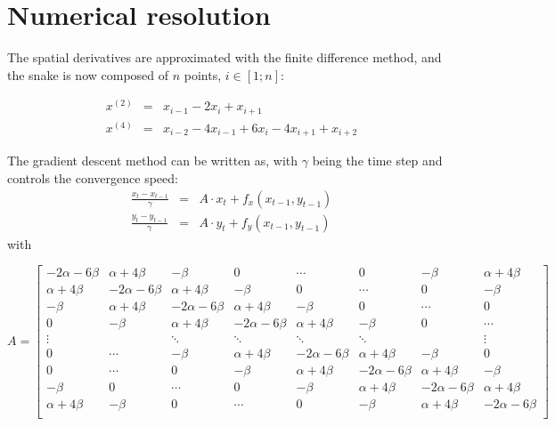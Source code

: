 \section{Numerical resolution}
The spatial derivatives are approximated with the finite difference method, and the snake is now composed of $n$ points, $i\in[1;n]$:

\begin{eqnarray*}
x^{(2)}&=&x_{i-1}-2x_i+x_{i+1} \\
x^{(4)}&=&x_{i-2}-4x_{i-1}+6x_i-4x_{i+1}+x_{i+2}
\end{eqnarray*}

The gradient descent method can be written as, with $\gamma$ being the time step and controls the convergence speed:
\begin{eqnarray*}
\frac{x_t-x_{t-1}}{\gamma} &=& A\cdot x_t + f_x(x_{t-1}, y_{t-1})\\
\frac{y_t-y_{t-1}}{\gamma} &=& A\cdot y_t + f_y(x_{t-1}, y_{t-1}) 
\end{eqnarray*}
with

$$A=\left[\begin{smallmatrix}
 -2\alpha-6\beta & \alpha+4\beta  & -\beta        &        0 &\cdots          & 0        & -\beta & \alpha+4\beta \\
 \alpha+4\beta   &-2\alpha-6\beta & \alpha+4\beta & -\beta   & 0   &\cdots          &     0   & -\beta        \\
 -\beta          & \alpha+4\beta  &-2\alpha-6\beta& \alpha+4\beta  & -\beta        & 0        &\cdots   & 0               \\
 0               &-\beta          & \alpha+4\beta &-2\alpha-6\beta & \alpha+4\beta & -\beta   & 0      & \cdots \\
 \vdots          &                &     \ddots    &    \ddots      &   \ddots      &  \ddots  &        &   \vdots \\
 0 &     \cdots         &-\beta          & \alpha+4\beta &-2\alpha-6\beta & \alpha+4\beta & -\beta   & 0 \\
0 & \cdots         &0              &-\beta          & \alpha+4\beta &-2\alpha-6\beta & \alpha+4\beta & -\beta \\
-\beta & 0 & \cdots &0             &-\beta          & \alpha+4\beta &-2\alpha-6\beta & \alpha+4\beta \\
\alpha+4\beta & -\beta & 0 & \cdots       &0       &-\beta          & \alpha+4\beta &-2\alpha-6\beta  \\
\end{smallmatrix}\right]$$

